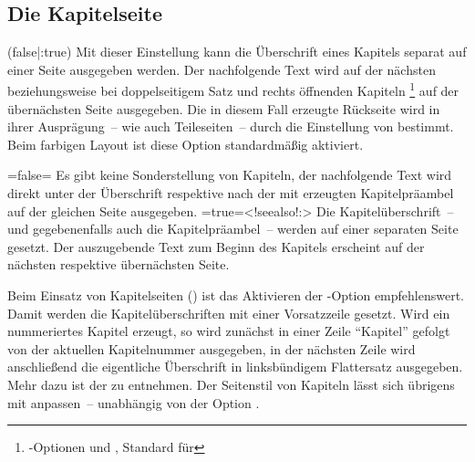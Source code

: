 \begin{DeclareEntity*}{}
\begin{DeclareEntity*}{}
\begin{DeclareEntity*}{}
\subsection{%
  Die Kapitelseite%
  \label{sec:chapter}%
}
%
\begin{Declaration}
  {}
  (false|:true)
Mit dieser Einstellung kann die Überschrift eines Kapitels separat auf einer 
Seite ausgegeben werden. Der nachfolgende Text wird auf der nächsten 
beziehungsweise bei doppelseitigem Satz und rechts öffnenden Kapiteln%
\footnote{%
  \KOMAScript-Optionen  und , 
  Standard für %
}
auf der übernächsten Seite ausgegeben. Die in diesem Fall erzeugte Rückseite 
wird in ihrer Ausprägung~-- wie auch Teileseiten~-- durch die Einstellung von 
 bestimmt. Beim farbigen Layout ist diese Option 
standardmäßig aktiviert. 
\begin{DeclareValues}
\itemval=false=
  Es gibt keine Sonderstellung von Kapiteln, der nachfolgende Text wird direkt 
  unter der Überschrift respektive nach der mit  
  erzeugten Kapitelpräambel auf der gleichen Seite ausgegeben.
\itemval*=true=<!seealso!:>
  Die Kapitelüberschrift~-- und gegebenenfalls auch die Kapitelpräambel~-- 
  werden auf einer separaten Seite gesetzt. Der auszugebende Text zum Beginn 
  des Kapitels erscheint auf der nächsten respektive übernächsten Seite.
\end{DeclareValues}

Beim Einsatz von Kapitelseiten () ist das Aktivieren 
der \KOMAScript-Option  
empfehlenswert. Damit werden die Kapitelüberschriften mit einer Vorsatzzeile 
gesetzt. Wird ein nummeriertes Kapitel erzeugt, so wird zunächst in einer Zeile 
\enquote{Kapitel} gefolgt von der aktuellen Kapitelnummer ausgegeben, in der 
nächsten Zeile wird anschließend die eigentliche Überschrift in linksbündigem 
Flattersatz ausgegeben. Mehr dazu ist der  
zu entnehmen. Der Seitenstil von Kapiteln lässt sich übrigens mit 
anpassen~-- unabhängig von der Option .
\end{Declaration}


\end{DeclareEntity*}
\end{DeclareEntity*}
\end{DeclareEntity*}
